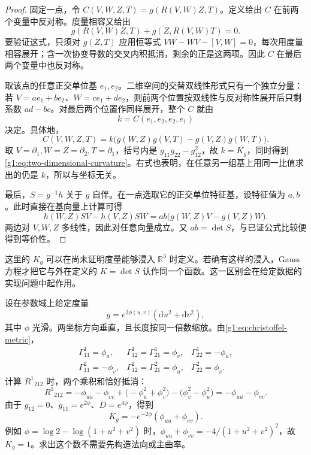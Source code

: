 \begin{proof}
	固定一点，令 \(C(V,W,Z,T)=g(R(V,W)Z,T)\)。定义给出 \(C\) 在前两个变量中反对称。度量相容又给出
	\[
		g(R(V,W)Z,T)+g(Z,R(V,W)T)=0.
	\]
	要验证这式，只须对 \(g(Z,T)\) 应用恒等式 \(VW-WV-[V,W]=0\)，每次用度量相容展开；含一次协变导数的交叉内积抵消，剩余的正是这两项。因此 \(C\) 在最后两个变量中也反对称。

	取该点的任意正交单位基 \(e_1,e_2\)。二维空间的交替双线性形式只有一个独立分量：若 \(V=ae_1+be_2\)、\(W=ce_1+de_2\)，则前两个位置按双线性与反对称性展开后只剩系数 \(ad-bc\)。对最后两个位置作同样展开，整个 \(C\) 就由
	\[
		k=C(e_1,e_2,e_2,e_1)
	\]
	决定。具体地，
	\[
		C(V,W,Z,T)=k\bigl(g(W,Z)g(V,T)-g(V,Z)g(W,T)\bigr).
	\]
	取 \(V=\partial_1,W=Z=\partial_2,T=\partial_1\)，括号内是 \(g_{11}g_{22}-g_{12}^2\)，故 \(k=K_g\)，同时得到\eqref{g1:eq:two-dimensional-curvature}。右式也表明，在任意另一组基上用同一比值求出的仍是 \(k\)，所以与坐标无关。

	最后，\(S=g^{-1}h\) 关于 \(g\) 自伴。在一点选取它的正交单位特征基，设特征值为 \(a,b\)。此时直接在基向量上计算可得
	\[
		h(W,Z)SV-h(V,Z)SW
		=ab\bigl(g(W,Z)V-g(V,Z)W\bigr).
	\]
	两边对 \(V,W,Z\) 多线性，因此对任意向量成立。又 \(ab=\det S\)，与已证公式比较便得到等价性。
\end{proof}

这里的 \(K_g\) 可以在尚未证明度量能够浸入 \(\mathbb R^3\) 时定义。若确有这样的浸入，Gauss 方程才把它与外在定义的 \(K=\det S\) 认作同一个函数。这一区别会在给定数据的实现问题中起作用。

\begin{example}
	\label{g1:exm:conformal-curvature}
	设在参数域上给定度量
	\[
		g=e^{2\phi(u,v)}(\mathrm du^2+\mathrm dv^2),
	\]
	其中 \(\phi\) 光滑。两坐标方向垂直，且长度按同一倍数缩放。由\eqref{g1:eq:christoffel-metric}，
	\[
		\begin{array}{lll}
			\Gamma^1_{11}=\phi_u,&\Gamma^1_{12}=\Gamma^1_{21}=\phi_v,&\Gamma^1_{22}=-\phi_u,\\
			\Gamma^2_{11}=-\phi_v,&\Gamma^2_{12}=\Gamma^2_{21}=\phi_u,&\Gamma^2_{22}=\phi_v.
		\end{array}
	\]
	计算 \(R^1{}_{212}\) 时，两个乘积和恰好抵消：
	\[
		R^1{}_{212}
		=-\phi_{uu}-\phi_{vv}
		+\bigl(-\phi_u^2+\phi_v^2\bigr)
		-\bigl(\phi_v^2-\phi_u^2\bigr)
		=-\phi_{uu}-\phi_{vv}.
	\]
	由于 \(g_{12}=0\)、\(g_{11}=e^{2\phi}\)、\(D=e^{4\phi}\)，得到
	\begin{equation}
		\label{g1:eq:conformal-gauss-curvature}
		K_g=-e^{-2\phi}(\phi_{uu}+\phi_{vv}).
	\end{equation}
	例如 \(\phi=\log2-\log(1+u^2+v^2)\) 时，\(\phi_{uu}+\phi_{vv}=-4/(1+u^2+v^2)^2\)，故 \(K_g=1\)。求出这个数不需要先构造法向或主曲率。
\end{example}

